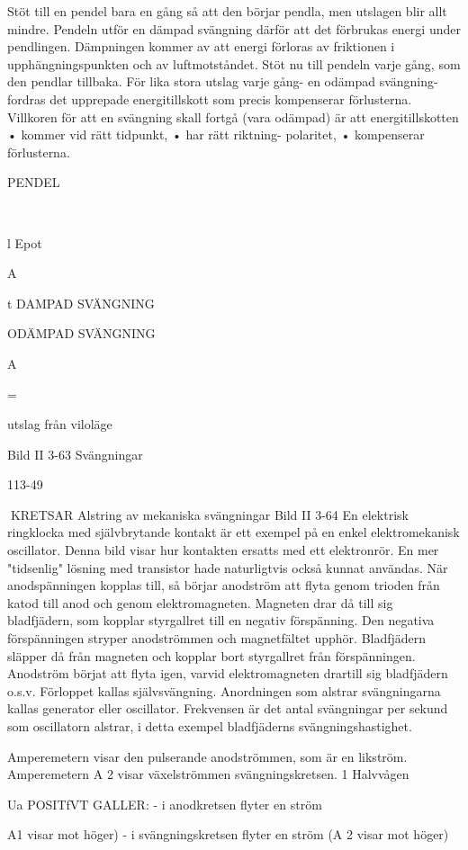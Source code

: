 {{{Stöt till en pendel bara en gång så att den
börjar pendla, men utslagen blir allt mindre.
Pendeln utför en dämpad svängning därför
att det förbrukas energi under pendlingen.
Dämpningen kommer av att energi förloras av friktionen i upphängningspunkten och
av luftmotståndet.
Stöt nu till pendeln varje gång, som den
pendlar tillbaka. För lika stora utslag varje
gång- en odämpad svängning- fordras det
upprepade energitillskott som precis kompenserar förlusterna.
Villkoren för att en svängning skall fortgå
(vara odämpad) är att energitillskotten
• kommer vid rätt tidpunkt,
• har rätt riktning- polaritet,
• kompenserar förlusterna.

PENDEL

\

l
Epot

A

t
DAMPAD SVÄNGNING

ODÄMPAD SVÄNGNING

A

=

utslag från viloläge

Bild II 3-63 Svängningar

113-49

KRETSAR
Alstring av mekaniska svängningar
Bild II 3-64
En elektrisk ringklocka med självbrytande
kontakt är ett exempel på en enkel elektromekanisk oscillator. Denna bild visar hur
kontakten ersatts med ett elektronrör. En
mer "tidsenlig" lösning med transistor hade
naturligtvis också kunnat användas.
När anodspänningen kopplas till, så börjar anodström att flyta genom trioden från
katod till anod och genom elektromagneten.
Magneten drar då till sig bladfjädern, som
kopplar styrgallret till en negativ förspänning.
Den negativa förspänningen stryper anodströmmen och magnetfältet upphör. Bladfjädern släpper då från magneten och kopplar
bort styrgallret från förspänningen. Anodström börjat att flyta igen, varvid elektromagneten drartill sig bladfjädern o.s.v. Förloppet
kallas självsvängning.
Anordningen som alstrar svängningarna
kallas generator eller oscillator. Frekvensen
är det antal svängningar per sekund som
oscillatorn alstrar, i detta exempel bladfjäderns svängningshastighet.

Amperemetern
visar den pulserande
anodströmmen, som är en likström.
Amperemetern A 2 visar växelströmmen
svängningskretsen.
1 Halvvågen

Ua
POSITfVT GALLER:
- i anodkretsen flyter en ström
{A1 visar mot höger)
- i svängningskretsen flyter en ström
(A 2 visar mot höger)

}}}}
